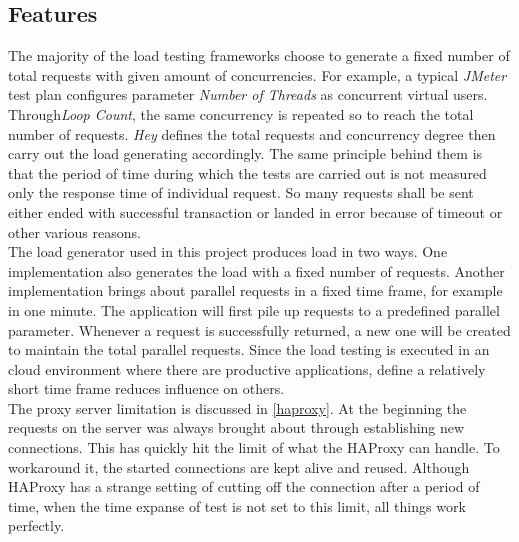 \subsection{Features}
\label{load generator}
The majority of the load testing frameworks choose to generate a fixed number of total requests with given amount of concurrencies.  For example, a typical \textit{JMeter} test plan configures parameter \textit{Number of Threads} as concurrent virtual users. Through\textit{Loop Count}, the same concurrency is repeated so to reach the total number of requests. \textit{Hey} defines the total requests and concurrency degree then carry out the load generating accordingly. The same principle behind them is that the period of time during which the tests are carried out is not measured only the response time of individual request. So many requests shall be sent either ended with successful transaction or landed in error because of timeout or other various reasons. \\
The load generator used in this project produces load in two ways. One implementation also generates the load with a fixed number of requests. Another implementation brings about parallel requests in a fixed time frame, for example in one minute. The application will first pile up requests to a predefined parallel parameter. Whenever a request is successfully returned, a new one will be created to maintain the total parallel requests. Since the load testing is executed in an cloud environment where there are productive applications, define a relatively short time frame reduces influence on others.\\
The proxy server limitation is discussed in \ref{haproxy}. At the beginning the requests on the server was always brought about through establishing new connections. This has quickly hit the limit of what the HAProxy can handle. To workaround it, the started connections are kept alive and reused. Although HAProxy has a strange setting of cutting off the connection after a period of time, when the time expanse of test is not set to this limit, all things work perfectly. 

